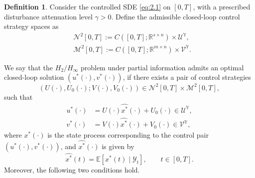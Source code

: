 \documentclass[lettersize,journal]{IEEEtran}
\theoremstyle{plain}
\theoremstyle{definition}
\newtheorem{defn}[thm]{Definition}
\begin{document}
\begin{defn}\label{defn:2.2}
	Consider the controlled SDE \eqref{eq:2.1} on $[0,T]$, with a prescribed disturbance attenuation level $\gamma > 0$. Define the admissible closed-loop control strategy spaces as
	\begin{equation*}
		\begin{aligned}
			&\mathcal{N}^2[0,T] := C([0,T];\mathbb{R}^{s \times n}) \times \mathcal{U}^{\mathbb{Y}},\\
			&\mathcal{M}^2[0,T] := C([0,T];\mathbb{R}^{m \times n}) \times \mathcal{V}^{\mathbb{Y}}.
		\end{aligned}
	\end{equation*}
	
	We say that the $H_2/H_{\infty}$ problem under partial information admits an optimal closed-loop solution $(u^*(\cdot),v^*(\cdot))$, if there exists a pair of control strategies
	\begin{equation*}
		(U(\cdot),U_0(\cdot);V(\cdot),V_0(\cdot)) \in \mathcal{N}^2[0,T] \times \mathcal{M}^2[0,T],
	\end{equation*}
	such that
	\begin{equation}\label{eq:2.3}
		\begin{aligned}
			u^*(\cdot) &= U(\cdot)\widehat{x^*}(\cdot) + U_0(\cdot) \in \mathcal{U}^{\mathbb{Y}},\\
			v^*(\cdot) &= V(\cdot)\widehat{x^*}(\cdot) + V_0(\cdot) \in \mathcal{V}^{\mathbb{Y}},
		\end{aligned}
	\end{equation}
	where $x^*(\cdot)$ is the state process corresponding to the control pair $(u^*(\cdot),v^*(\cdot))$, and $\widehat{x^*}(\cdot)$ is given by
	\[
	\widehat{x^*}(t) = \mathbb{E}[x^*(t)\mid \mathcal{Y}_t], \qquad t \in [0,T].
	\]
	Moreover, the following two conditions hold.
	

\end{defn}
\end{document}
